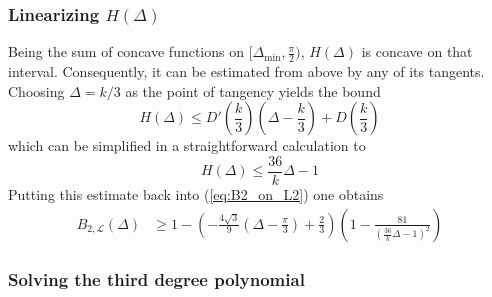 \documentclass{article}
\begin{document}
\subsubsection*{Linearizing $H(\Delta)$}
Being the sum of concave functions on $[\Delta_{\text{min}},\frac\pi 2)$, $H(\Delta)$ is concave on that interval. Consequently, it can be estimated from above by any of its tangents. Choosing $\Delta = k/3$ as the point of tangency yields the bound
\[H(\Delta) \le D'(\frac k3)(\Delta - \frac k3) + D(\frac k3)\]
which can be simplified in a straightforward calculation to 
\begin{equation} \label{eq:estimate_D_tangent}
    H(\Delta) \le \frac{36}k\Delta - 1
\end{equation}
Putting this estimate back into (\ref{eq:B2_on_L2}) one obtains
\begin{align} \label{eq:B2_on_L3}
    B_{2,\mathcal{L}}(\Delta) &\ge 1 - \left(-\frac{4\sqrt 3}{9}(\Delta-\frac \pi 3) + \frac 23\right)\left( 1-\frac{81}{\left(\frac{36}k\Delta - 1\right)^{2}}\right)
\end{align}

\subsubsection*{Solving the third degree polynomial}
\end{document}

